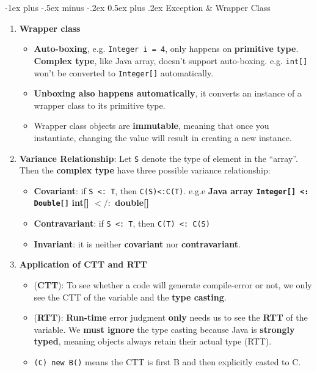 \documentclass[10pt, landscape]{article}
\makeatletter
\renewcommand{\section}{\@startsection{section}{1}{0mm}%
                                {-1ex plus -.5ex minus -.2ex}%
                                {0.5ex plus .2ex}%
                                {\normalfont\large\bfseries}}
\makeatother
\begin{document}
\begin{multicols}{4}
\section{Exception \& Wrapper Class}
\begin{enumerate}
    \item \textbf{Wrapper class}
    \begin{itemize}
        \item \textbf{Auto-boxing}, e.g. \texttt{Integer i = 4}, only happens on \textbf{primitive type}. \textbf{Complex type}, like Java array, doesn't support auto-boxing. e.g. \texttt{int[]} won't be converted to \texttt{Integer[]} automatically.
        \item \textbf{Unboxing also happens automatically}, it converts an instance of a wrapper class to its primitive type.
        \item Wrapper class objects are \textbf{immutable}, meaning that once you instantiate, changing the value will result in creating a new instance.
    \end{itemize}
    \item \textbf{Variance Relationship}: Let \texttt{S} denote the type of element in the ``array''. Then the \textbf{complex type} have three possible variance relationship:
    \begin{itemize}
        \item \textbf{Covariant}: if \texttt{S <: T}, then \texttt{C(S)<:C(T)}. e.g.e \textbf{Java array \texttt{Integer[] <: Double[]}} \textbf{int[] $</:$ double[]}
        \item \textbf{Contravariant}: if \texttt{S <: T}, then \texttt{C(T) <: C(S)}
        \item \textbf{Invariant}: it is neither \textbf{covariant} nor \textbf{contravariant}.
    \end{itemize}
    \item \textbf{Application of CTT and RTT}
    \begin{itemize}
        \item (\textbf{CTT}): To see whether a code will generate compile-error or not, we only see the CTT of the variable and the \textbf{type casting}.
        \item (\textbf{RTT}): \textbf{Run-time} error judgment \textbf{only} needs us to see the \textbf{RTT} of the variable. We \textbf{must ignore} the type casting because Java is \textbf{strongly typed}, meaning objects always retain their actual type (RTT).
        \item \texttt{(C) new B()} means the CTT is first B and then explicitly casted to C.

\end{itemize}
\end{enumerate}
\end{multicols}
\end{document}
